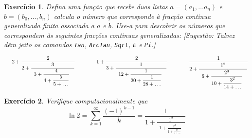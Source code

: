 \documentclass{article}
\newtheorem{ex}{Exercício}[section]
\begin{document}
\begin{ex}
Defina uma função que recebe duas listas $a=(a_1,\dots a_n)$ e $b=(b_0, \dots, b_n)$ calcula o número que corresponde à fracção continua generalizada finita associada a $a$ e $b$. Use-a para descobrir os números que correspondem às seguintes fracções continuas generalizadas: [Sugestão: Talvez dêm jeito os comandos \texttt{Tan}, \texttt{ArcTan}, \texttt{Sqrt}, \texttt{E} e \texttt{Pi}.]
  
\vspace{-1mm}  

   \[
\hspace{0.5cm}
2+
\displaystyle{ \frac{2 }
{ 2+\displaystyle{\frac{3}{ 
                           {\begin{array}{l}
                              3+\displaystyle{ \frac{4}{4+ \displaystyle \frac{5}{5+\ldots } }  }\,\, 
                           \end{array}
                           }
                           }}}} \qquad \qquad 
                              1+
\displaystyle{ \frac{2 }
{ 3+\displaystyle{\frac{1}{ 
                        {\begin{array}{l}
                              12+\displaystyle{ \frac{1}{20+ \displaystyle \frac{1}{28+\ldots } }  }\,\, 
                             \end{array}
                             }
                             }}}}      \qquad \qquad      
\displaystyle{ \frac{1 }
{ 2+\displaystyle{\frac{1^2}{ 
                          {\begin{array}{l}
                      6+\displaystyle{ \frac{2^3}{10+ \displaystyle \frac{3^2}{14+\ldots } }  }\,\, 
                        \end{array}
                         }
                          }}}}                                                   
\]
\end{ex}

\begin{ex}
Verifique computacionalmente que $$\ln 2 = \sum_{k=1}^{\infty} \frac{(-1)^{k-1}}{k}=\displaystyle{ \frac{1 }
{ 1+\displaystyle{\frac{1^2}{ 
                           {\begin{array}{l}
                              1+\displaystyle{ \frac{2^2}{1+ \displaystyle \frac{3^2}{1+\ldots } }  }\,\, 
                           \end{array}
                           }
                           }}}} $$
\end{ex}
\end{document}
